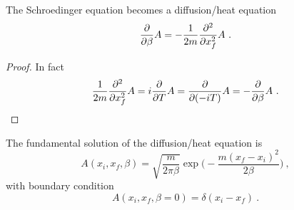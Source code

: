     The Schroedinger equation becomes a diffusion/heat equation 
    \begin{equation*}
        \frac{\partial}{\partial\beta} A = - \frac{1}{2m} \frac{\partial^2 }{\partial x_f^2} A ~.
    \end{equation*}
    \begin{proof}
        In fact
        \begin{equation*}
            \frac{1}{2m} \frac{\partial^2 }{\partial x_f^2} A = i \frac{\partial}{\partial T} A = \frac{\partial}{\partial(-iT)} A = - \frac{\partial}{\partial\beta} A ~.
        \end{equation*}
    \end{proof}
    The fundamental solution of the diffusion/heat equation is
    \begin{equation*}
            A(x_i, x_f, \beta) = \sqrt{\frac{m}{2\pi\beta}} \exp \Big (- \frac{m (x_f - x_i)^2}{2\beta} \Big) ~,
    \end{equation*}
    with boundary condition
    \begin{equation*}
        A(x_i, x_f, \beta = 0) = \delta (x_i - x_f) ~.
    \end{equation*}

